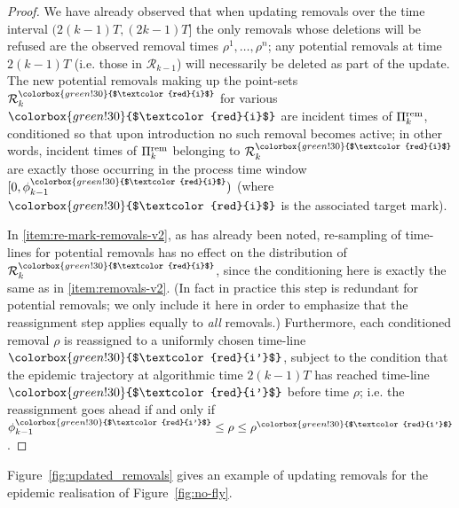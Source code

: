 \documentclass[]{article}
\newcommand{\Removals}{\mathcal{R}}
\newcommand{\Poisson}{\Pi}
\newcommand{\PoissonRem}{\Poisson^\textup{rem}}
\newcommand{\target}{{\colorbox{green!30}{$\textcolor{red}{i}$}}}
\newcommand{\targetm}{{\colorbox{green!30}{$\textcolor{red}{i'}$}}}
\begin{document}
\begin{proof}
We have already observed that when updating removals over the time interval \((2(k{-}1)T, (2k{-}1)T]\) 
the only removals whose deletions will be refused are the observed removal times \(\rho^1,\dots,\rho^n\);
any potential removals at time \(2(k{-}1)T\) 
(i.e. those in \(\Removals_{k-1}\)) 
will necessarily be deleted as part of the update. 
The new potential removals making up the point-sets \(\Removals^\target_k\)  for various \(\target\)
are incident times of \(\PoissonRem_k\),
conditioned so that upon introduction no such removal becomes active;
in other words, incident times of \(\PoissonRem_k\) belonging to \(\Removals^\target_k\) 
are exactly those occurring in the process time window \([0,\phi^\target_{k-1})\)
(where \(\target\) is the associated target mark).

In \ref{item:re-mark-removals-v2}, as has already been noted, 
re-sampling of time-lines for potential removals 
has no effect on the distribution of \(\Removals^\target_k\),
since the conditioning here is exactly the same as in \ref{item:removals-v2}. 
(In fact in practice this step is redundant for potential removals; 
we only include it here in order to emphasize that the reassignment step applies equally to
\emph{all} removals.) 
Furthermore, each conditioned removal \(\rho\) is reassigned to a uniformly chosen time-line \(\targetm\), 
subject to the condition that the epidemic trajectory at algorithmic time \(2(k{-}1)T\) 
has reached time-line \(\targetm\) before time \(\rho\); 
i.e. the reassignment goes ahead if and only if \(\phi^{\targetm}_{k-1}\le \rho\le \rho^{\targetm}\).
\end{proof}

Figure~\ref{fig:updated_removals} gives an example of updating removals for the epidemic realisation
of Figure~\ref{fig:no-fly}. 
\end{document}
